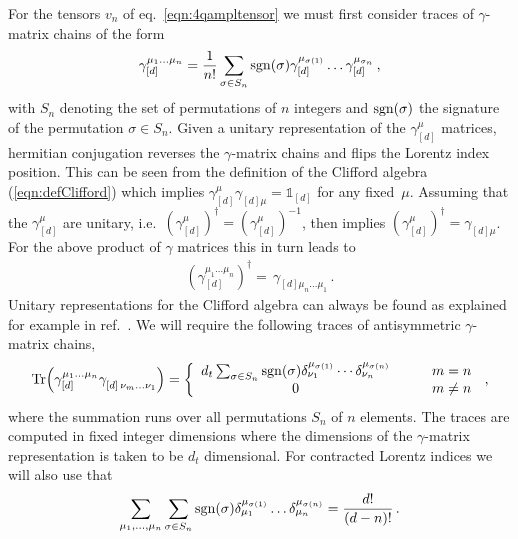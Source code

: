 For the tensors $v_n$ of eq.~\eqref{eqn:4qampltensor} we
must first consider traces of $\gamma$-matrix chains of
the form
%
\begin{align}\label{eq:basisGammaChainII}
\gamma_{[d]}^{\mu_1 \ldots \mu_n} = \frac{1}{n!} \sum_{ \sigma\in
S_n} \operatorname{sgn}(\sigma) \gamma_{[d]}^{\mu_{\sigma(1)}} \ldots
\gamma_{[d]}^{\mu_{\sigma_n}}\,,
\end{align}
with $S_n$ denoting the set of permutations of $n$
integers and $\operatorname{sgn}(\sigma)$ the signature of the permutation $\sigma\in S_n$.
%
Given a unitary
representation of the $\gamma_{[d]}^\mu$ matrices, hermitian
conjugation reverses the $\gamma$-matrix chains and flips the
Lorentz index position.
%
This can be seen from the definition of the Clifford algebra
(\cref{eqn:defClifford}) which implies 
$\gamma_{[d]}^\mu \gamma^{}_{[d]\mu} = \mathbb{1}_{[d]}$ for 
any fixed~$\mu$.
Assuming that the $\gamma_{[d]}^\mu$ are unitary, i.e.\ 
$(\gamma_{[d]}^\mu)^\dagger = (\gamma_{[d]}^\mu)^{-1}$,
then implies
$(\gamma_{[d]}^\mu)^\dagger=\gamma_{[d]\mu}$. 
For the above product of $\gamma$ matrices this in turn leads to
%
\begin{eqnarray}
  (\gamma_{[d]}^{\mu_1 \ldots \mu_n} )^\dagger =\,
  \gamma_{[d]\mu_n \ldots \mu_1}^{\phantom{\mu}} \,.
\end{eqnarray}
%
%
Unitary representations for the Clifford algebra can always be
found as explained for example in 
ref.~\cite{Kreuzer:susylectures}.
%
We will require the following traces of antisymmetric
$\gamma$-matrix chains,
%
\begin{eqnarray}
  \label{eq:traceChain}
  \Tr(\gamma_{[d]}^{\mu_1 \ldots \mu_n} \gamma^{
    \phantom{\mu}}_{[d]\,\nu_m \ldots \nu_1})= 
    \left\{ \begin{array}{cc} d_t 
      \sum_{ \sigma\in  S_n} \operatorname{sgn}(\sigma)
      \delta^{\mu_{\sigma(1)}}_{\nu_1}\cdots\delta^{\mu_{\sigma(n)}}_
      {\nu_n} &\qquad m=n   \\
      0 &\qquad m\neq n\end{array}  
    \right. 
    \,,
  \end{eqnarray}
%
where the summation runs over all permutations $S_n$ of $n$ elements.
The traces are computed in fixed integer dimensions where the dimensions of the
$\gamma$-matrix representation is taken to be $d_t$ dimensional.
For contracted Lorentz indices we will also use that
\begin{eqnarray}
  \label{eqn:simpletrace}
  \sum_{\mu_1,\ldots,\mu_n} 
  \sum_{ \sigma\in  S_n} \operatorname{sgn}(\sigma)
  \delta^{\mu_{\sigma(1)}}_{\mu_1}\ldots
  \delta^{\mu_{\sigma(n)}}_{\mu_n}
  = \frac{d!}{(d-n)! }\,.
\end{eqnarray}
